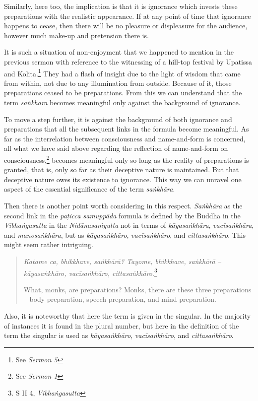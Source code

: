 Similarly, here too, the implication is that it is ignorance which invests these preparations with the realistic appearance. If at any point of time that ignorance happens to cease, then there will be no pleasure or displeasure for the audience, however much make-up and pretension there is.

It is such a situation of non-enjoyment that we happened to mention in the previous sermon with reference to the witnessing of a hill-top festival by Upatissa and Kolita.\footnote{See \emph{Sermon 5}} They had a flash of insight due to the light of wisdom that came from within, not due to any illumination from outside. Because of it, those preparations ceased to be preparations. From this we can understand that the term \emph{saṅkhāra} becomes meaningful only against the background of ignorance.

To move a step further, it is against the background of both ignorance and preparations that all the subsequent links in the formula become meaningful. As far as the interrelation between consciousness and name-and-form is concerned, all what we have said above regarding the reflection of name-and-form on consciousness,\footnote{See \emph{Sermon 1}} becomes meaningful only so long as the reality of preparations is granted, that is, only so far as their deceptive nature is maintained. But that deceptive nature owes its existence to ignorance. This way we can unravel one aspect of the essential significance of the term \emph{saṅkhāra}.

Then there is another point worth considering in this respect. \emph{Saṅkhāra} as the second link in the \emph{paṭicca samuppāda} formula is defined by the Buddha in the \emph{Vibhaṅgasutta} in the \emph{Nidānasaṁyutta} not in terms of \emph{kāyasaṅkhāra}, \emph{vacīsaṅkhāra}, and \emph{manosaṅkhāra}, but as \emph{kāyasaṅkhāro}, \emph{vacīsaṅkhāro}, and \emph{cittasaṅkhāro}. This might seem rather intriguing.

\begin{quote}
\emph{Katame ca, bhikkhave, saṅkhārā? Tayome, bhikkhave, saṅkhārā -- kāyasaṅkhāro, vacīsaṅkhāro, cittasaṅkhāro}.\footnote{S II 4, \emph{Vibhaṅgasutta}}

What, monks, are preparations? Monks, there are these three preparations -- body-preparation, speech-preparation, and mind-preparation.
\end{quote}

Also, it is noteworthy that here the term is given in the singular. In the majority of instances it is found in the plural number, but here in the definition of the term the singular is used as \emph{kāyasaṅkhāro}, \emph{vacīsaṅkhāro}, and \emph{cittasaṅkhāro}.

